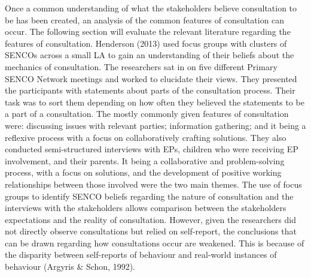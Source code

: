 \documentclass[
  english,
  man]{apa7}
\begin{document}
Once a common understanding of what the stakeholders believe consultation to be has been created, an analysis of the common features of consultation can occur. The following section will evaluate the relevant literature regarding the features of consultation. Henderson (2013) used focus groups with clusters of SENCOs across a small LA to gain an understanding of their beliefs about the mechanics of consultation. The researchers sat in on five different Primary SENCO Network meetings and worked to elucidate their views. They presented the participants with statements about parts of the consultation process. Their task was to sort them depending on how often they believed the statements to be a part of a consultation. The mostly commonly given features of consultation were: discussing issues with relevant parties; information gathering; and it being a reflexive process with a focus on collaboratively crafting solutions. They also conducted semi-structured interviews with EPs, children who were receiving EP involvement, and their parents. It being a collaborative and problem-solving process, with a focus on solutions, and the development of positive working relationships between those involved were the two main themes. The use of focus groups to identify SENCO beliefs regarding the nature of consultation and the interviews with the stakeholders allows comparison between the stakeholders expectations and the reality of consultation. However, given the researchers did not directly observe consultations but relied on self-report, the conclusions that can be drawn regarding how consultations occur are weakened. This is because of the disparity between self-reports of behaviour and real-world instances of behaviour (Argyris \& Schon, 1992).
\end{document}
